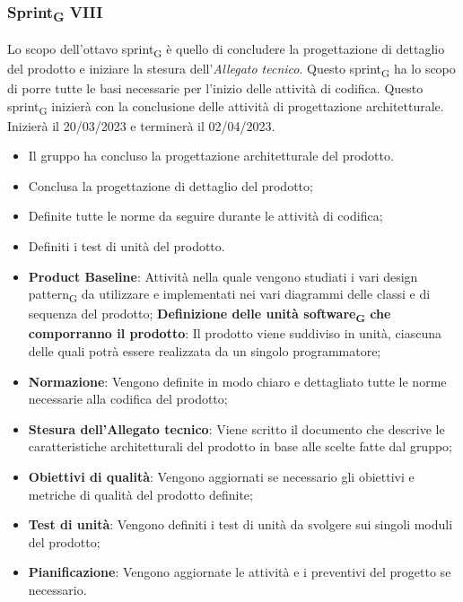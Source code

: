 \subsubsection{Sprint\textsubscript{G} VIII}
Lo scopo dell'ottavo sprint\textsubscript{G} è quello di concludere la progettazione di dettaglio del prodotto e iniziare la stesura dell’\textit{Allegato tecnico}. Questo sprint\textsubscript{G} ha lo scopo di porre tutte le basi necessarie per l'inizio delle attività di codifica.
Questo sprint\textsubscript{G} inizierà con la conclusione delle attività di progettazione architetturale. Inizierà il 20/03/2023 e terminerà il 02/04/2023.

\:
\begin{itemize}
	\item Il gruppo ha concluso la progettazione architetturale del prodotto.
\end{itemize}

\:
\begin{itemize}
	\item Conclusa la progettazione di dettaglio del prodotto;
	\item Definite tutte le norme da seguire durante le attività di codifica;
	\item Definiti i test di unità del prodotto.
\end{itemize}

\:
\begin{itemize}
	\item \textbf{Product Baseline}: Attività nella quale vengono studiati i vari design pattern\textsubscript{G} da utilizzare e implementati nei vari diagrammi delle classi e di sequenza del prodotto;
	\subitem \textbf{Definizione delle unità software\textsubscript{G} che comporranno il prodotto}: Il prodotto viene suddiviso in unità, ciascuna delle quali potrà essere realizzata da un singolo programmatore;
	\item \textbf{Normazione}: Vengono definite in modo chiaro e dettagliato tutte le norme necessarie alla codifica del prodotto;
	\item \textbf{Stesura dell’Allegato tecnico}: Viene scritto il documento che descrive le caratteristiche architetturali del prodotto in base alle scelte fatte dal gruppo;
	\item \textbf{Obiettivi di qualità}: Vengono aggiornati se necessario gli obiettivi e metriche di qualità del prodotto definite;
	\item \textbf{Test di unità}: Vengono definiti i test di unità da svolgere sui singoli moduli del prodotto;
	\item \textbf{Pianificazione}: Vengono aggiornate le attività e i preventivi del progetto se necessario.
\end{itemize}

